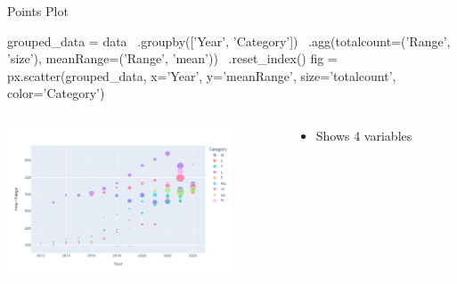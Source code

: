 \documentclass[ignorenonframetext,xcolor=x11names]{beamer}
\begin{document}
\begin{frame}[fragile]{Points Plot}
\footnotesize
\begin{pythoncode}
grouped_data = data \
    .groupby(['Year', 'Category']) \
    .agg(totalcount=('Range', 'size'),
         meanRange=('Range', 'mean')) \
    .reset_index()
fig = px.scatter(grouped_data, 
           x='Year', y='meanRange', 
           size='totalcount', color='Category')
\end{pythoncode}
\begin{columns}
\begin{column}{.65\textwidth}
  \includegraphics[height=1.75in]{px.fuel.pointsSize.pdf}
\end{column}
\begin{column}{.35\textwidth}
\footnotesize
\begin{itemize}
   \item Shows 4 variables
\end{itemize}
\end{column}
\end{columns}
\end{frame}
\end{document}
